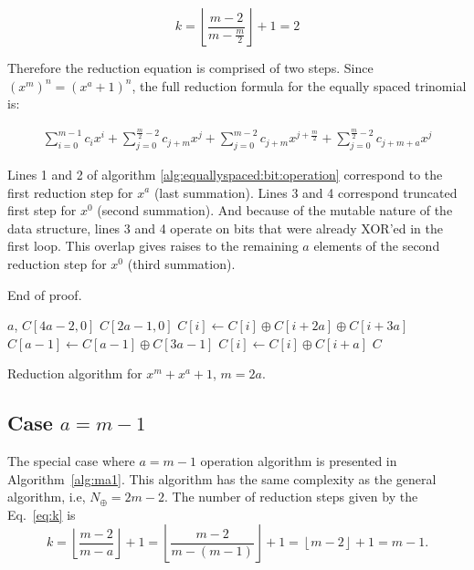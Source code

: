 \begin{equation}
  k = \left \lfloor \frac{m-2}{m-\frac{m}{2}} \right \rfloor + 1 = 2
\end{equation}

Therefore the reduction equation is comprised of two steps. Since $(x^m)^n = (x^a + 1)^n$, the full reduction formula for the equally spaced trinomial is:

\begin{gather}
    \sum_{i = 0}^{m-1}{c_i x^i} +
        \sum_{j = 0}^{\frac{m}{2} - 2}{c_{j + m} x^j} +
        \sum_{j = 0}^{m - 2}{c_{j + m} x^{j+\frac{m}{2}}} +
        \sum_{j = 0}^{\frac{m}{2} - 2}{c_{j + m + a} x^j}
\end{gather}

Lines 1 and 2 of algorithm \ref{alg:equallyspaced:bit:operation} correspond to the first reduction step for $x^a$ (last summation). Lines 3 and 4 correspond truncated first step for $x^0$ (second summation). And because of the mutable nature of the data structure, lines 3 and 4 operate on bits that were already XOR'ed in the first loop. This overlap gives raises to the remaining $a$ elements of the second reduction step for $x^0$ (third summation).

End of proof.

\begin{algorithm}
\begin{algorithmic}[1]
  \REQUIRE $a$, $C[4a-2,0]$
  \ENSURE $C[2a-1,0]$
    \STATE $C[i] \gets C[i] \oplus C[i+2a] \oplus C[i+3a]$
    \ENDFOR
  \STATE $C[a-1] \gets C[a-1] \oplus C[3a-1]$ 
    \STATE $C[i] \gets C[i] \oplus C[i+a]$
  \ENDFOR
  \RETURN $C$
  \caption{Reduction algorithm for $x^{m} + x^a +1$, $m=2a$.}
  \label{alg:esp}
\end{algorithmic}
\end{algorithm}

\subsection{Case $a=m-1$}
The special case where $a=m-1$ operation algorithm is presented in Algorithm~\ref{alg:ma1}. This algorithm has the same complexity as the general algorithm, i.e, $N_\oplus = 2m-2$. The number of reduction steps given by the Eq.~\ref{eq:k} is $$k=\left \lfloor \frac{m-2}{m-a} \right \rfloor + 1 = \left \lfloor \frac{m-2}{m-(m-1)} \right \rfloor + 1 = \left \lfloor m-2 \right \rfloor + 1=m-1.$$

